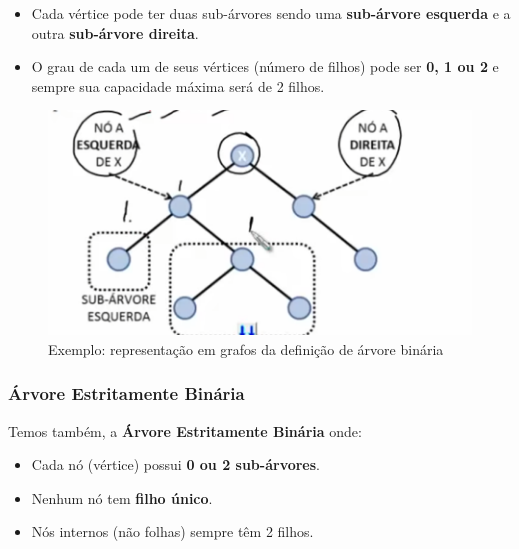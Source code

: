 \documentclass[
	12pt,				%
	oneside,   	        %
	a4paper,			%
	chapter=TITLE,		%
	section=TITLE,		%
	subsection=TITLE,	%
	subsubsection=TITLE,%
	english,			%
	french,				%
	spanish,			%
	brazil,				%
	]{pacotes/abntex2}
\begin{document}
\begin{itemize}
    \item Cada vértice pode ter duas sub-árvores sendo uma \textbf{sub-árvore esquerda} e a outra \textbf{sub-árvore direita}.
    \item O grau de cada um de seus vértices (número de filhos) pode ser \textbf{0, 1 ou 2} e sempre sua capacidade máxima será de 2 filhos.
\end{itemize}

\begin{figure}[H]
 \centering
     \includegraphics[scale=0.8]{Figuras/fig-binaria.png}
     \caption{Exemplo: representação em grafos da definição de árvore binária \cite{imagem4}}
    \label{fig:binaria}
 \end{figure}

\subsubsection{\textbf{Árvore Estritamente Binária}}
\label{subsubsec:estritamente-binária}

Temos também, a \textbf{Árvore Estritamente Binária} onde: 

\begin{itemize}
    \item Cada nó (vértice) possui \textbf{0 ou 2 sub-árvores}.
    \item Nenhum nó tem \textbf{filho único}.
    \item Nós internos (não folhas) sempre têm 2 filhos.
\end{itemize}
\end{document}
